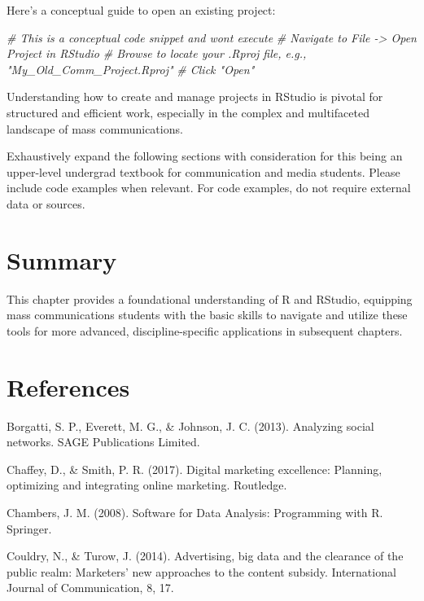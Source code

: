 \documentclass[
  b5paper]{book}
\newenvironment{Shaded}{\begin{snugshade}}{\end{snugshade}}
\newcommand{\CommentTok}[1]{\textcolor[rgb]{0.56,0.35,0.01}{\textit{#1}}}
\begin{document}
Here's a conceptual guide to open an existing project:

\begin{Shaded}
\begin{Highlighting}[]
\CommentTok{\# This is a conceptual code snippet and won\textquotesingle{}t execute}
\CommentTok{\# Navigate to File {-}\textgreater{} Open Project in RStudio}
\CommentTok{\# Browse to locate your .Rproj file, e.g., "My\_Old\_Comm\_Project.Rproj"}
\CommentTok{\# Click "Open"}
\end{Highlighting}
\end{Shaded}

Understanding how to create and manage projects in RStudio is pivotal for structured and efficient work, especially in the complex and multifaceted landscape of mass communications.

Exhaustively expand the following sections with consideration for this being an upper-level undergrad textbook for communication and media students. Please include code examples when relevant. For code examples, do not require external data or sources.

\hypertarget{summary}{%
\section{Summary}\label{summary}}

This chapter provides a foundational understanding of R and RStudio, equipping mass communications students with the basic skills to navigate and utilize these tools for more advanced, discipline-specific applications in subsequent chapters.

\hypertarget{references-1}{%
\section{References}\label{references-1}}

Borgatti, S. P., Everett, M. G., \& Johnson, J. C. (2013). Analyzing social networks. SAGE Publications Limited.

Chaffey, D., \& Smith, P. R. (2017). Digital marketing excellence: Planning, optimizing and integrating online marketing. Routledge.

Chambers, J. M. (2008). Software for Data Analysis: Programming with R. Springer.

Couldry, N., \& Turow, J. (2014). Advertising, big data and the clearance of the public realm: Marketers' new approaches to the content subsidy. International Journal of Communication, 8, 17.
\end{document}
